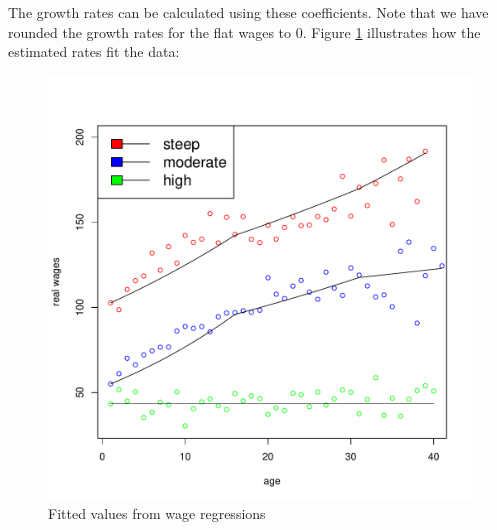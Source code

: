 \documentclass[]{elsarticle}
\begin{document}
\begin{appendix}
The growth rates can be calculated using these coefficients. Note that we have rounded the growth rates for the flat wages to $0$. Figure \ref{fig:heterwage} illustrates how the estimated rates fit the data:

\begin{figure}[h!]
	\centering
	\includegraphics[scale=0.3]{figs/heterwage.pdf}
	\caption{Fitted values from wage regressions}
	\label{fig:heterwage}
\end{figure}






\end{appendix}
\end{document}
